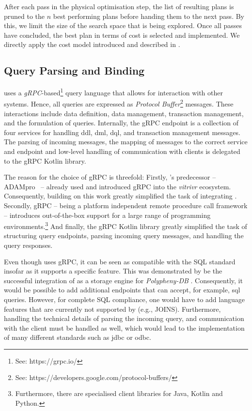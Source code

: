 After each pass in the physical optimisation step, the list of resulting plans is pruned to the $n$ best performing plans before handing them to the next pass. By this, we limit the size of the search space that is being explored. Once all passes have concluded, the best plan in terms of cost is selected and implemented. We directly apply the cost model introduced and described in .

\subsection{Query Parsing and Binding}
\cottontail{} uses a \emph{gRPC}-based\footnote{See: https://grpc.io/} query language that allows for interaction with other systems. Hence, all queries are expressed as \emph{Protocol Buffer}\footnote{See: https://developers.google.com/protocol-buffers/} messages. These interactions include data definition, data management, transaction management, and the formulation of queries. Internally, the gRPC endpoint is a collection of four services for handling \acrshort{ddl}, \acrshort{dml}, \acrshort{dql}, and transaction management messages. The parsing of incoming messages, the mapping of messages to the correct service and endpoint and low-level handling of communication with clients is delegated to the gRPC Kotlin library. 

The reason for the choice of gRPC is threefold: Firstly, \cottontail{}'s predecessor -- ADAMpro~\cite{Giangreco:2016Adam} -- already used and introduced gRPC into the \emph{vitrivr} ecosystem. Consequently, building on this work greatly simplified the task of integrating \cottontail{}. Secondly, gRPC -- being a platform independent remote procedure call framework -- introduces out-of-the-box support for a large range of programming environments.\footnote{Furthermore, there are specialised client libraries for Java, Kotlin and Python.} And finally, the gRPC Kotlin library greatly simplified the task of structuring query endpoints, parsing incoming query messages, and handling the query responses.

Even though \cottontail{} uses gRPC, it can be seen as compatible with the SQL standard insofar as it supports a specific feature. This was demonstrated by be the successful integration of \cottontail{} as a storage engine for \emph{Polypheny-DB} \cite{Vogt:2018Polypheny,Vogt:2020Polypheny}. Consequently, it would be possible to add additional endpoints that can accept, for example, \acrshort{sql} queries. However, for complete SQL compliance, one would have to add language features that are currently not supported by \cottontail{} (e.g., JOINS). Furthermore, handling the technical details of parsing the incoming query, and communication with the client must be handled as well, which would lead to the implementation of many different standards such as \acrshort{jdbc} or \acrshort{odbc}.


